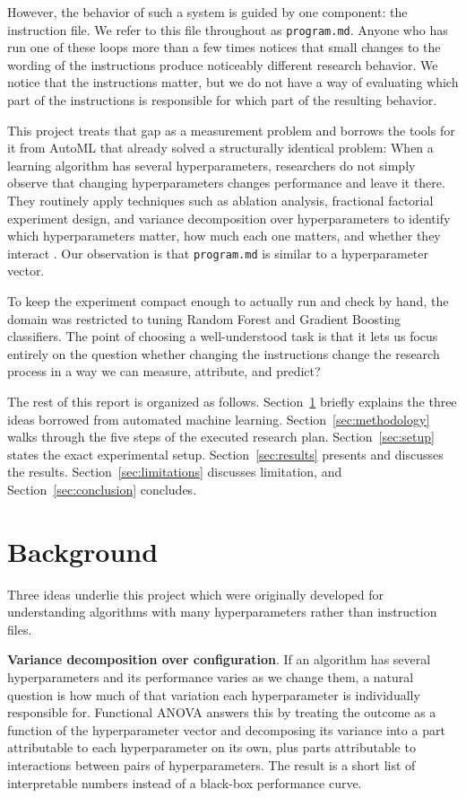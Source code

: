 \documentclass[11pt]{article}
\begin{document}
However, the behavior of such a system is guided by one component: the instruction file. We refer to this file throughout as \texttt{program.md}. Anyone who has run one of these loops more than a few times notices that small changes to the wording of the instructions produce noticeably different research behavior. We notice that the instructions matter, but we do not have a way of evaluating which part of the instructions is responsible for which part of the resulting behavior.

This project treats that gap as a measurement problem and borrows the tools for it from AutoML that already solved a structurally identical problem: When a learning algorithm has several hyperparameters, researchers do not simply observe that changing hyperparameters changes performance and leave it there. They routinely apply techniques such as ablation analysis, fractional factorial experiment design, and variance decomposition over hyperparameters to identify which hyperparameters matter, how much each one matters, and whether they interact \cite{fawcetthoos,hutter2014fanova,plackettburman}. Our observation is that \texttt{program.md} is similar to a 
hyperparameter vector.

To keep the experiment compact enough to actually run and check by hand, the domain was restricted to tuning Random Forest and Gradient Boosting classifiers. The point of choosing a well-understood task is that it lets us focus entirely on the question whether changing the instructions change the research process in a way we can measure, attribute, and predict?

The rest of this report is organized as follows. Section~\ref{sec:background} briefly explains the three ideas borrowed from automated machine learning. Section~\ref{sec:methodology} walks through the five steps of the executed research plan. Section~\ref{sec:setup} states the exact experimental setup. Section~\ref{sec:results} presents and discusses the results. Section~\ref{sec:limitations} discusses limitation, and Section~\ref{sec:conclusion} concludes.

\section{Background}
\label{sec:background}

Three ideas underlie this project which were originally developed for understanding algorithms with many hyperparameters rather than instruction files.

\textbf{Variance decomposition over configuration}. If an algorithm has several hyperparameters and its performance varies as we change them, a natural question is how much of that variation each hyperparameter is individually responsible for. Functional ANOVA \cite{hutter2014fanova} answers this by treating the outcome as a function of the hyperparameter vector and decomposing its variance into a part attributable to each hyperparameter on its own, plus parts attributable to interactions between pairs of hyperparameters. The result is a short list of interpretable numbers instead of a black-box performance curve.
\end{document}
